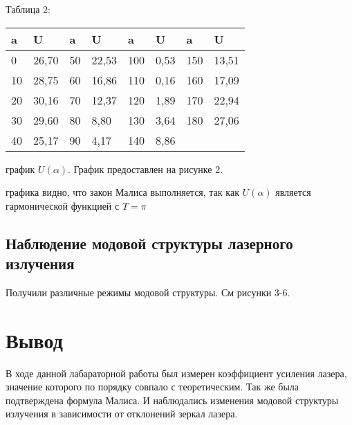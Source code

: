\begin{table}[h!]
    \begin{center}
    Таблица 2: \\
    \begin{tabular}{|l|l|l|l|l|l|l|l|}
    \hline
    a  & U     & a  & U     & a   & U    & a   & U     \\ \hline
    0  & 26,70 & 50 & 22,53 & 100 & 0,53 & 150 & 13,51 \\ \hline
    10 & 28,75 & 60 & 16,86 & 110 & 0,16 & 160 & 17,09 \\ \hline
    20 & 30,16 & 70 & 12,37 & 120 & 1,89 & 170 & 22,94 \\ \hline
    30 & 29,60 & 80 & 8,80  & 130 & 3,64 & 180 & 27,06 \\ \hline
    40 & 25,17 & 90 & 4,17  & 140 & 8,86 &     &       \\ \hline
    \end{tabular}
    \end{center}
\end{table}

\newpage

 график $ U(\alpha) $. График предоставлен на рисунке 2.


 графика видно, что закон Малиса выполняется, так как $ U(\alpha) $ является
гармонической функцией с $ T = \pi $

\subsection{Наблюдение модовой структуры лазерного излучения}

Получили различные режимы модовой структуры. См рисунки 3-6.



\newpage

\section{Вывод}

В ходе данной лабараторной работы был измерен коэффициент усиления лазера, значение
которого по порядку совпало с теоретическим. Так же была подтверждена формула Малиса.
И наблюдались изменения модовой структуры излучения в зависимости от отклонений зеркал
лазера.